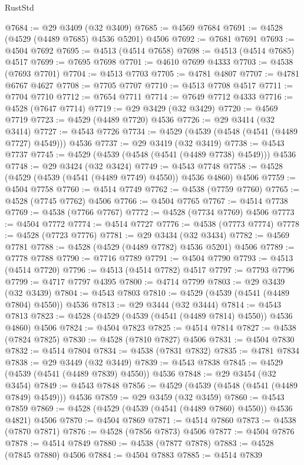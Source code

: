 \begin{lexlean}{RustStd}
\begin{coremodule}
@7684 := @29 @3409 (@32 @3409)
@7685 := @4569 @7684
@7691 := @4528 (@4529 (@4489 @7685) @4536 @5201) @4506
@7692 := @7681 @7691
@7693 := @4504 @7692
@7695 := @4513 (@4514 @7658)
@7698 := @4513 (@4514 @7685) @4517
@7699 := @7695 @7698
@7701 := @4610 @7699 @4333
@7703 := @4538 (@7693 @7701)
@7704 := @4513 @7703
@7705 := @4781 @4807
@7707 := @4781 @6767 @4627
@7708 := @7705 @7707
@7710 := @4513 @7708 @4517
@7711 := @7704 @7710
@7712 := @7654 @7711
@7714 := @7649 @7712 @4333
@7716 := @4528 (@7647 @7714)
@7719 := @29 @3429 (@32 @3429)
@7720 := @4569 @7719
@7723 := @4529 (@4489 @7720) @4536
@7726 := @29 @3414 (@32 @3414)
@7727 := @4543 @7726
@7734 := @4529 (@4539 (@4548 (@4541 (@4489 @7727) @4549))) @4536
@7737 := @29 @3419 (@32 @3419)
@7738 := @4543 @7737
@7745 := @4529 (@4539 (@4548 (@4541 (@4489 @7738) @4549))) @4536
@7748 := @29 @3424 (@32 @3424)
@7749 := @4543 @7748
@7758 := @4528 (@4529 (@4539 (@4541 (@4489 @7749) @4550)) @4536 @4860) @4506
@7759 := @4504 @7758
@7760 := @4514 @7749
@7762 := @4538 (@7759 @7760)
@7765 := @4528 (@7745 @7762) @4506
@7766 := @4504 @7765
@7767 := @4514 @7738
@7769 := @4538 (@7766 @7767)
@7772 := @4528 (@7734 @7769) @4506
@7773 := @4504 @7772
@7774 := @4514 @7727
@7776 := @4538 (@7773 @7774)
@7778 := @4528 (@7723 @7776)
@7781 := @29 @3434 (@32 @3434)
@7782 := @4569 @7781
@7788 := @4528 (@4529 (@4489 @7782) @4536 @5201) @4506
@7789 := @7778 @7788
@7790 := @7716 @7789
@7791 := @4504 @7790
@7793 := @4513 (@4514 @7720)
@7796 := @4513 (@4514 @7782) @4517
@7797 := @7793 @7796
@7799 := @4717 @7797 @4395
@7800 := @4714 @7799
@7803 := @29 @3439 (@32 @3439)
@7804 := @4543 @7803
@7810 := @4529 (@4539 (@4541 (@4489 @7804) @4550)) @4536
@7813 := @29 @3444 (@32 @3444)
@7814 := @4543 @7813
@7823 := @4528 (@4529 (@4539 (@4541 (@4489 @7814) @4550)) @4536 @4860) @4506
@7824 := @4504 @7823
@7825 := @4514 @7814
@7827 := @4538 (@7824 @7825)
@7830 := @4528 (@7810 @7827) @4506
@7831 := @4504 @7830
@7832 := @4514 @7804
@7834 := @4538 (@7831 @7832)
@7835 := @4781 @7834
@7838 := @29 @3449 (@32 @3449)
@7839 := @4543 @7838
@7845 := @4529 (@4539 (@4541 (@4489 @7839) @4550)) @4536
@7848 := @29 @3454 (@32 @3454)
@7849 := @4543 @7848
@7856 := @4529 (@4539 (@4548 (@4541 (@4489 @7849) @4549))) @4536
@7859 := @29 @3459 (@32 @3459)
@7860 := @4543 @7859
@7869 := @4528 (@4529 (@4539 (@4541 (@4489 @7860) @4550)) @4536 @4821) @4506
@7870 := @4504 @7869
@7871 := @4514 @7860
@7873 := @4538 (@7870 @7871)
@7876 := @4528 (@7856 @7873) @4506
@7877 := @4504 @7876
@7878 := @4514 @7849
@7880 := @4538 (@7877 @7878)
@7883 := @4528 (@7845 @7880) @4506
@7884 := @4504 @7883
@7885 := @4514 @7839

\end{coremodule}
\end{lexlean}
